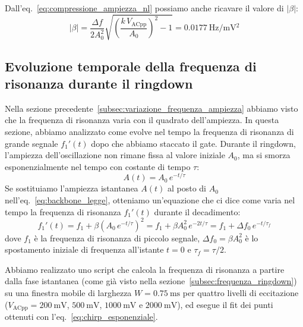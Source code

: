 \documentclass[11pt,a4paper]{article}
\begin{document}
\vspace{0.3cm}
\noindent Dall'eq.~\eqref{eq:compressione_ampiezza_nl} possiamo anche ricavare il valore di $|\beta|$:
\begin{equation}
    \label{eq:stima_beta_da_compressione}
    |\beta| = \frac{\Delta f}{2 A_0^2} \sqrt{\left( \frac{k \, V_{\text{ACpp}}}{A_0} \right)^2 - 1} = \SI{0.0177}{\hertz/\milli\volt^2}
\end{equation}

\subsection{Evoluzione temporale della frequenza di risonanza durante il ringdown}
\label{subsec:chirp_frequenza_ringdown}

Nella sezione precedente~\ref{subsec:variazione_frequenza_ampiezza} abbiamo visto che la frequenza di risonanza varia con il quadrato dell'ampiezza. In questa sezione, abbiamo analizzato come evolve nel tempo la frequenza di risonanza di grande segnale $f_1'(t)$ dopo che abbiamo staccato il gate. Durante il ringdown, l'ampiezza dell'oscillazione non rimane fissa al valore iniziale $A_0$, ma si smorza esponenzialmente nel tempo con costante di tempo $\tau$:
\begin{equation}
    A(t) = A_0 \, e^{-t/\tau}
\end{equation}
Se sostituiamo l'ampiezza istantanea $A(t)$ al posto di $A_0$ nell'eq.~\eqref{eq:backbone_legge}, otteniamo un'equazione che ci dice come varia nel tempo la frequenza di risonanza $f_1'(t)$ durante il decadimento:
\begin{equation}
    \label{eq:chirp_esponenziale}
    f_1'(t) = f_1 + \beta \left( A_0 \, e^{-t/\tau} \right)^2 = f_1 + \beta A_0^2 \, e^{-2t/\tau} = f_1 + \Delta f_0 \, e^{-t/\tau_f}
\end{equation}
dove $f_1$ è la frequenza di risonanza di piccolo segnale, $\Delta f_0 = \beta A_0^2$ è lo spostamento iniziale di frequenza all'istante $t = 0$ e $\tau_f = \tau / 2$. 

\vspace{0.3cm}
\noindent Abbiamo realizzato uno script che calcola la frequenza di risonanza a partire dalla fase istantanea (come già visto nella sezione~\ref{subsec:frequenza_ringdown}) su una finestra mobile di larghezza $W = \SI{0.75}{\milli\second}$ per quattro livelli di eccitazione ($V_{\text{ACpp}} = \SI{200}{\milli\volt}$, $\SI{500}{\milli\volt}$, $\SI{1000}{\milli\volt}$ e $\SI{2000}{\milli\volt}$), ed esegue il fit dei punti ottenuti con l'eq.~\eqref{eq:chirp_esponenziale}.
\end{document}
